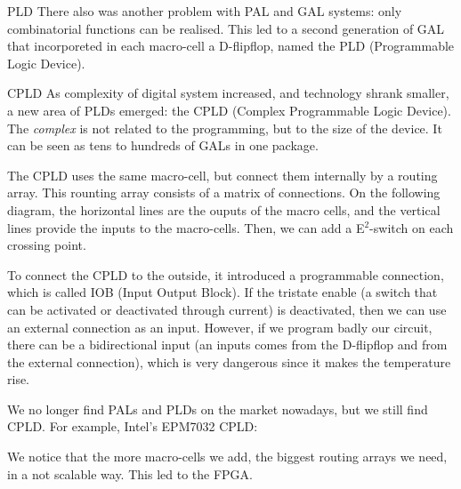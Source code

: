\documentclass[a4paper]{article}
\begin{document}
\begin{parag}{PLD}
    There also was another problem with PAL and GAL systems: only combinatorial functions can be realised. This led to a second generation of GAL that incorporeted in each macro-cell a D-flipflop, named the PLD (Programmable Logic Device).
\end{parag}

\begin{parag}{CPLD}
    As complexity of digital system increased, and technology shrank smaller, a new area of PLDs emerged: the CPLD (Complex Programmable Logic Device). The \textit{complex} is not related to the programming, but to the size of the device. It can be seen as tens to hundreds of GALs in one package.

    The CPLD uses the same macro-cell, but connect them internally by a routing array. This rounting array consists of a matrix of connections. On the following diagram, the horizontal lines are the ouputs of the macro cells, and the vertical lines provide the inputs to the macro-cells. Then, we can add a E$^2$-switch on each crossing point.

    To connect the CPLD to the outside, it introduced a programmable connection, which is called IOB (Input Output Block). If the tristate enable (a switch that can be activated or deactivated through current) is deactivated, then we can use an external connection as an input. However, if we program badly our circuit, there can be a bidirectional input (an inputs comes from the D-flipflop and from the external connection), which is very dangerous since it makes the temperature rise.

    We no longer find PALs and PLDs on the market nowadays, but we still find CPLD. For example, Intel's EPM7032 CPLD:

    We notice that the more macro-cells we add, the biggest routing arrays we need, in a not scalable way. This led to the FPGA.
\end{parag}
\end{document}
